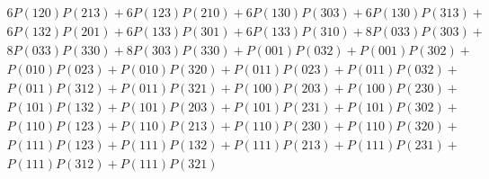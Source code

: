 \begin{align*}
	6P(120)P(213) + 6P(123)P(210) + 6P(130)P(303) + 6P(130)P(313)+ \\ 
	6P(132)P(201) + 6P(133)P(301) + 6P(133)P(310) + 8P(033)P(303)+ \\ 
	8P(033)P(330) + 8P(303)P(330) + P(001)P(032) + P(001)P(302)+ \\ 
	P(010)P(023) + P(010)P(320) + P(011)P(023) + P(011)P(032)+ \\ 
	P(011)P(312) + P(011)P(321) + P(100)P(203) + P(100)P(230)+ \\ 
	P(101)P(132) + P(101)P(203) + P(101)P(231) + P(101)P(302)+ \\ 
	P(110)P(123) + P(110)P(213) + P(110)P(230) + P(110)P(320)+ \\ 
	P(111)P(123) + P(111)P(132) + P(111)P(213) + P(111)P(231)+ \\ 
	P(111)P(312) + P(111)P(321)
\end{align*}